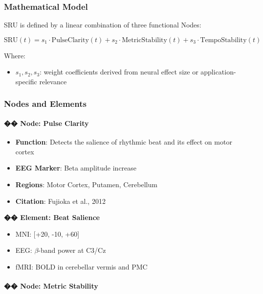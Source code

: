 \documentclass[10pt]{article}
\begin{document}
\subsubsection*{Mathematical Model}

SRU is defined by a linear combination of three functional Nodes:

\[
\text{SRU}(t) = s_1 \cdot \text{PulseClarity}(t) + s_2 \cdot \text{MetricStability}(t) + s_3 \cdot \text{TempoStability}(t)
\]

Where:

\begin{itemize}
    \item $s_1, s_2, s_3$: weight coefficients derived from neural effect size or application-specific relevance
\end{itemize}

\subsubsection*{Nodes and Elements}

\paragraph{�� Node: Pulse Clarity}

\begin{itemize}
    \item \textbf{Function}: Detects the salience of rhythmic beat and its effect on motor cortex
    \item \textbf{EEG Marker}: Beta amplitude increase
    \item \textbf{Regions}: Motor Cortex, Putamen, Cerebellum
    \item \textbf{Citation}: Fujioka et al., 2012
\end{itemize}

\textbf{�� Element: Beat Salience}

\begin{itemize}
    \item MNI: [+20, -10, +60]
    \item EEG: $\beta$-band power at C3/Cz
    \item fMRI: BOLD in cerebellar vermis and PMC
\end{itemize}

\paragraph{�� Node: Metric Stability}
\end{document}
